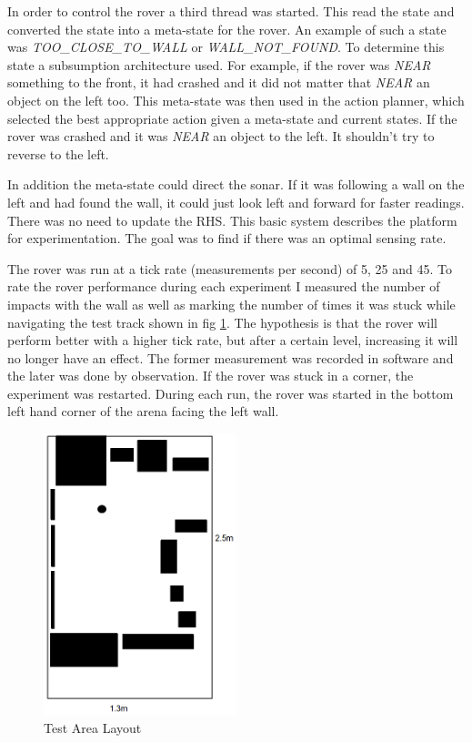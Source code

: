 \documentclass[a4paper,12pt,twocolumn]{report}
\begin{document}
In order to control the rover a third thread was started. This read the state and converted the state into a meta-state for the rover. An example of such a state was \emph{TOO\_CLOSE\_TO\_WALL} or \emph{WALL\_NOT\_FOUND}. To determine this state a subsumption architecture used. For example, if the rover was \emph{NEAR} something to the front, it had crashed and it did not matter that \emph{NEAR} an object on the left too. This meta-state was then used in the action planner, which selected the best appropriate action given a meta-state and current states. If the rover was crashed and it was \emph{NEAR} an object to the left. It shouldn't try to reverse to the left.

In addition the meta-state could direct the sonar. If it was following a wall on the left and had found the wall, it could just look left and forward for faster readings. There was no need to update the RHS. This basic system describes the platform for experimentation. The goal was to find if there was an optimal sensing rate.

The rover was run at a tick rate (measurements per second) of 5, 25 and 45. To rate the rover performance during each experiment I measured the number of impacts with the wall as well as marking the number of times it was stuck while navigating the test track shown in fig \ref{fig:area}. The hypothesis is that the rover will perform better with a higher tick rate, but after a certain level, increasing it will no longer have an effect. The former measurement was recorded in software and the later was done by observation. If the rover was stuck in a corner, the experiment was restarted. During each run, the rover was started in the bottom left hand corner of the arena facing the left wall.

\begin{figure}
 \includegraphics[width=0.5\textwidth]{test-area-layout}
 \caption{Test Area Layout}
 \label{fig:area}
\end{figure}
\end{document}
